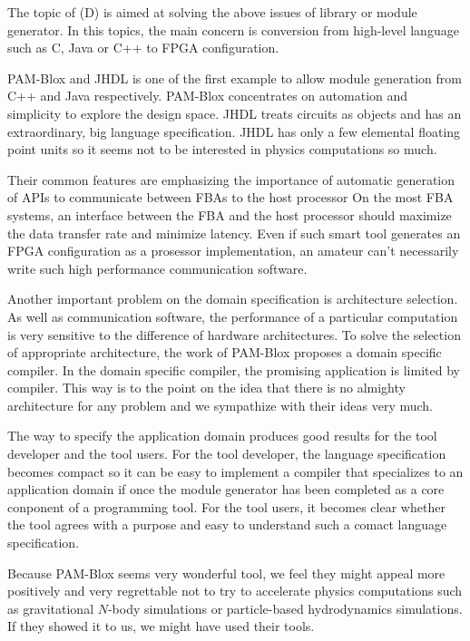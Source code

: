 \documentclass{llncs}
\begin{document}
The topic of (D) is aimed at solving the above issues of library or
module generator.  In this topics, the main concern is conversion from
high-level language such as C, Java or C++ to FPGA configuration.

PAM-Blox\cite{MMF97} and JHDL\cite{BH98} is one of the first example
to allow module generation from C++ and Java respectively.  PAM-Blox
concentrates on automation and simplicity to explore the design space.
JHDL treats circuits as objects and has an extraordinary, big language
specification.  JHDL has only a few elemental floating point units so
it seems not to be interested in physics computations so much.  

Their common features are emphasizing the importance of automatic
generation of APIs to communicate between FBAs to the host processor
On the most FBA systems, an interface between the FBA and the host
processor should maximize the data transfer rate and minimize latency.
Even if such smart tool generates an FPGA configuration as a prosessor
implementation, an amateur can't necessarily write such high performance
communication software.

Another important problem on the domain specification is architecture
selection. As well as communication software, the performance of a
particular computation is very sensitive to the difference of hardware
architectures. To solve the selection of appropriate architecture, the
work of PAM-Blox proposes a domain specific compiler\cite{MPMF01}.  In
the domain specific compiler, the promising application is limited by
compiler. This way is to the point on the idea that there is no
almighty architecture for any problem and we sympathize with their
ideas very much. 

The way to specify the application domain produces good results for
the tool developer and the tool users.  For the tool developer, the
language specification becomes compact so it can be easy to implement
a compiler that specializes to an application domain if once the
module generator has been completed as a core conponent of a
programming tool.  For the tool users, it becomes clear whether the
tool agrees with a purpose and easy to understand such a comact
language specification.

Because PAM-Blox seems very wonderful tool, we feel they might appeal
more positively and very regrettable not to try to accelerate physics
computations such as gravitational $N$-body simulations or
particle-based hydrodynamics simulations. If they showed it to us, we
might have used their tools.
\end{document}
